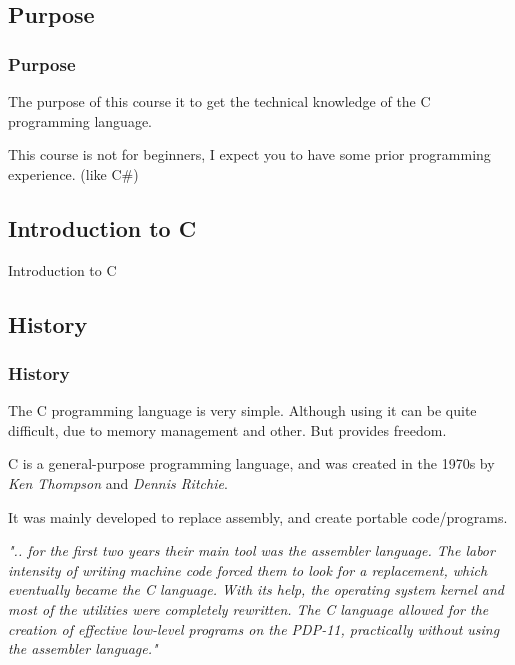 \documentclass[
	11pt, %
]{beamer}
\newcommand{\quotetext}[1]{\begin{block}\footnotesize\textit{#1}\end{block}}
\begin{document}
\begin{frame}
    \subsection{Purpose}
	\frametitle{Purpose}

    The purpose of this course it to get the technical knowledge of the C programming language.

    \bigskip

    This course is not for beginners, I expect you to have some prior programming experience. (like C\#)

\end{frame}



\begin{frame}
    \section{Introduction to C}
	\begin{center}
		{\Huge Introduction to C}
	\end{center}
\end{frame}

\begin{frame}
    \subsection{History}
	\frametitle{History}

    The C programming language is very simple.
    Although using it can be quite difficult, due to memory management and other.
    But provides freedom.

    \bigskip

    C is a general-purpose programming language, and was created in the 1970s by \textit{Ken Thompson} and \textit{Dennis Ritchie}. %

    \bigskip

    It was mainly developed to replace assembly, and create portable code/programs.

    \bigskip

    \quotetext{".. for the first two years their main tool was the assembler language. The labor intensity of writing machine code forced them to look for a replacement, which eventually became the C language. With its help, the operating system kernel and most of the utilities were completely rewritten. The C language allowed for the creation of effective low-level programs on the PDP-11, practically without using the assembler language."}


\end{frame}
\end{document}

